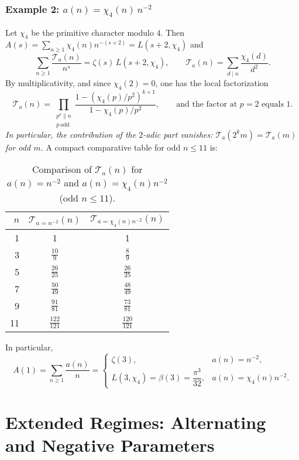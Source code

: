 \documentclass[11pt,a4paper]{amsart}
\theoremstyle{plain}
\theoremstyle{definition}
\theoremstyle{remark}
\begin{document}
\subsubsection*{Example 2: $a(n)=\chi_4(n)\,n^{-2}$}
Let $\chi_4$ be the primitive character modulo $4$. Then $A(s)=\sum_{n\ge1}\chi_4(n)n^{-(s+2)}=L(s+2,\chi_4)$ and
\[
\sum_{n\ge1}\frac{\mathcal{T}_a(n)}{n^{s}}=\zeta(s)\,L(s+2,\chi_4),\qquad
\mathcal{T}_a(n)=\sum_{d\mid n}\frac{\chi_4(d)}{d^{2}}.
\]
By multiplicativity, and since $\chi_4(2)=0$, one has the local factorization
\[
\mathcal{T}_a(n)=\prod_{\substack{p^k\parallel n\\ p\ \mathrm{odd}}}\frac{1-(\chi_4(p)/p^{2})^{k+1}}{1-\chi_4(p)/p^{2}},
\qquad\text{and the factor at }p=2\text{ equals }1.
\]
\emph{In particular, the contribution of the $2$-adic part vanishes: $\mathcal{T}_a(2^k m)=\mathcal{T}_a(m)$ for odd $m$.}
A compact comparative table for odd $n\le 11$ is:
\begin{table}[h]
\centering
\caption{Comparison of $\mathcal{T}_a(n)$ for $a(n)=n^{-2}$ and $a(n)=\chi_4(n)n^{-2}$ (odd $n\le 11$).}
\begin{tabular}{r c c}
\toprule
$n$ & $\mathcal{T}_{a=n^{-2}}(n)$ & $\mathcal{T}_{a=\chi_4(n)n^{-2}}(n)$\\
\midrule
1 & 1 & 1 \\
3 & \(\frac{10}{9}\) & \(\frac{8}{9}\) \\
5 & \(\frac{26}{25}\) & \(\frac{26}{25}\) \\
7 & \(\frac{50}{49}\) & \(\frac{48}{49}\) \\
9 & \(\frac{91}{81}\) & \(\frac{73}{81}\) \\
11 & \(\frac{122}{121}\) & \(\frac{120}{121}\) \\
\bottomrule
\end{tabular}
\end{table}


\noindent In particular,
\[
A(1)=\sum_{n\ge1}\frac{a(n)}{n}=
\begin{cases}
\zeta(3), & a(n)=n^{-2},\\[3pt]
L(3,\chi_4)=\beta(3)=\dfrac{\pi^{3}}{32}, & a(n)=\chi_4(n)n^{-2}.
\end{cases}
\]


\section{Extended Regimes: Alternating and Negative Parameters}
\end{document}
